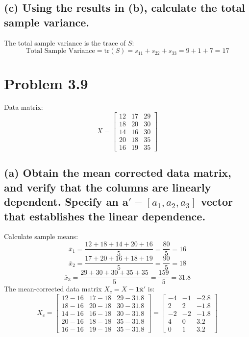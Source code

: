 \documentclass[11pt,a4paper]{article}
\begin{document}
\subsection*{(c) Using the results in (b), calculate the total sample variance.}

The total sample variance is the trace of $S$:
\[
\text{Total Sample Variance} = \text{tr}(S) = s_{11} + s_{22} + s_{33} = 9 + 1 + 7 = 17
\]

\hr

\section*{Problem 3.9}

Data matrix:
\[
X = \begin{bmatrix} 12 & 17 & 29 \\ 18 & 20 & 30 \\ 14 & 16 & 30 \\ 20 & 18 & 35 \\ 16 & 19 & 35 \end{bmatrix}
\]

\subsection*{(a) Obtain the mean corrected data matrix, and verify that the columns are linearly dependent. Specify an $\mathbf{a}' = [a_1, a_2, a_3]$ vector that establishes the linear dependence.}

Calculate sample means:
\[
\overline{x}_1 = \frac{12+18+14+20+16}{5} = \frac{80}{5} = 16
\]
\[
\overline{x}_2 = \frac{17+20+16+18+19}{5} = \frac{90}{5} = 18
\]
\[
\overline{x}_3 = \frac{29+30+30+35+35}{5} = \frac{159}{5} = 31.8
\]
The mean-corrected data matrix $X_c = X - \mathbf{1}\overline{\mathbf{x}}'$ is:
\[
X_c = \begin{bmatrix} 12-16 & 17-18 & 29-31.8 \\ 18-16 & 20-18 & 30-31.8 \\ 14-16 & 16-18 & 30-31.8 \\ 20-16 & 18-18 & 35-31.8 \\ 16-16 & 19-18 & 35-31.8 \end{bmatrix} = \begin{bmatrix} -4 & -1 & -2.8 \\ 2 & 2 & -1.8 \\ -2 & -2 & -1.8 \\ 4 & 0 & 3.2 \\ 0 & 1 & 3.2 \end{bmatrix}
\]
\end{document}

